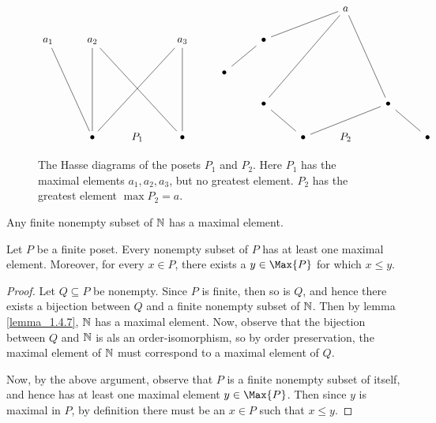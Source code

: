 \begin{figure}[h]
  \centering
  \[\begin{tikzcd}
  &&&&&&& a \\
    {a_1} & {a_2} && {a_3} && \bullet \\
          &&&& \bullet \\
          &&&&& \bullet &&& \bullet \\
          & \bullet & {P_1} & \bullet &&& \bullet & {P_2} && \bullet
          \arrow[no head, from=1-8, to=2-6]
          \arrow[no head, from=1-8, to=4-6]
          \arrow[no head, from=1-8, to=4-9]
          \arrow[no head, from=2-2, to=5-2]
          \arrow[no head, from=2-4, to=5-4]
          \arrow[no head, from=2-6, to=3-5]
          \arrow[no head, from=4-9, to=5-10]
          \arrow[no head, from=5-2, to=2-1]
          \arrow[no head, from=5-2, to=2-4]
          \arrow[no head, from=5-4, to=2-2]
          \arrow[no head, from=5-7, to=4-6]
          \arrow[no head, from=5-7, to=4-9]
  \end{tikzcd}\]
  \caption{The Hasse diagrams of the posets $P_1$ and $P_2$. Here
    $P_1$ has the maximal elements $a_1, a_2, a_3$, but no greatest
  element. $P_2$ has the greatest element $\max{P_2}=a$.}
  \label{figure_1.4}
\end{figure}

\begin{lemma}\label{lemma_1.4.7}
  Any finite nonempty subset of $\mathbb{N}$ has a maximal element.
\end{lemma}

\begin{proposition}\label{proposition_1.4.8}
  Let $P$ be a finite poset. Every nonempty subset of $P$ has at least
  one maximal element. Moreover, for every $x \in P$, there exists a
  $y \in \Max{P}$ for which $x \leq y$.
\end{proposition}
\begin{proof}
  Let $Q \subseteq P$ be nonempty. Since $P$ is finite, then so is
  $Q$, and hence there exists a bijection  between $Q$ and a finite
  nonempty subset of $\mathbb{N}$. Then by lemma \ref{lemma_1.4.7}, $\mathbb{N}$ has a
  maximal element. Now, observe that the bijection between $Q$ and
  $\mathbb{N}$ is als an order-isomorphism, so by order preservation, the
  maximal element of $\mathbb{N}$ must correspond to a maximal element of $Q$.

  Now, by the above argument, observe that $P$ is a finite nonempty
  subset of itself, and hence has at least one maximal element $y \in
  \Max{P}$. Then since $y$ is maximal in $P$, by definition there must
  be an $x \in P$ such that $x \leq y$.
\end{proof}

